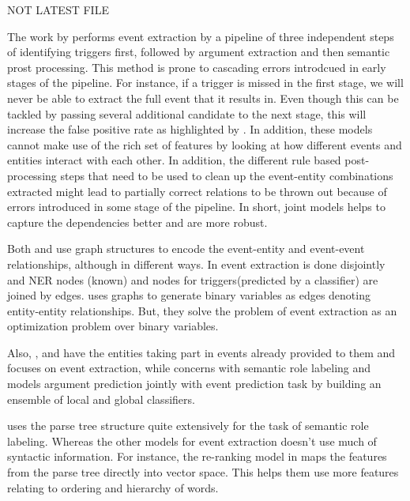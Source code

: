NOT LATEST FILE

The work by \citeauthor{bjorne} performs event extraction by a pipeline of three independent steps of identifying triggers first, followed by argument extraction and then semantic prost processing. This method  is prone to cascading errors introdcued in early stages of the pipeline. For instance, if a trigger is missed in the first stage, we will never be able to extract the full event that it results in. Even though this can be tackled by passing several additional candidate to the next stage, this will increase the false positive rate as highlighted by \cite{miwa2010c}. In addition, these models cannot make use of the rich set of features by looking at how different events and entities interact with each other. In addition, the different rule based post-processing steps that need to be used to clean up the event-entity combinations extracted might lead to partially correct relations to be thrown out because of errors introduced in some stage of the pipeline. In short, joint models helps to capture the dependencies better and are more robust.

Both \citeauthor{bjorne} and \citeauthor{riedelmc} use graph structures to encode the event-entity and event-event relationships, although in different ways. In \citeauthor{bjorne} event extraction is done disjointly and NER nodes (known) and nodes for triggers(predicted by a classifier) are joined by edges. \citeauthor{riedelmc} uses graphs to generate binary variables as edges denoting entity-entity relationships. But, they solve the problem of event extraction as an optimization problem over binary variables.

Also, \citeauthor{bjorne}, \citeauthor{chju2008ec} and \citeauthor{riedelmc} have the entities taking part in events already provided to them and focuses on event extraction, while \citeauthor{toutanova} concerns with semantic role labeling and models argument prediction jointly with event prediction task by building an ensemble of local and global classifiers.

\citeauthor{riedelmc} uses the parse tree structure quite extensively for the task of semantic role labeling. Whereas the other models for event extraction doesn't use much of syntactic information. For instance, the re-ranking model in \citeauthor{riedelmc} maps the features from the parse tree directly into vector space. This helps them use more features relating to ordering and hierarchy of words.
